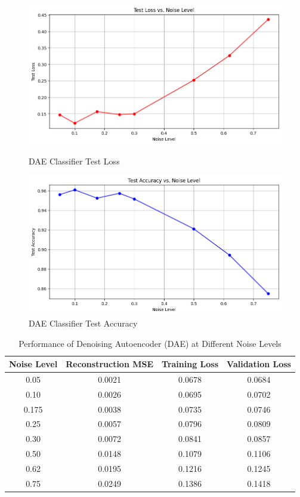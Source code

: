 \begin{figure}[htbp]
  \centering
  \begin{minipage}{0.49\textwidth}
    \includegraphics[width=\linewidth]{figures/dae_testloss.png}
    \caption{DAE Classifier Test Loss}
    \label{fig:dae_testloss}
  \end{minipage}\hfill
  \begin{minipage}{0.49\textwidth}
    \includegraphics[width=\linewidth]{figures/dae_testaccuracy.png}
    \caption{DAE Classifier Test Accuracy}
    \label{fig:dae_testaccuracy}
  \end{minipage}
\end{figure}

\vspace*{1.2in}

\begin{table}[ht]
\centering
\label{tab:dae_performance}
\begin{tabular}{c|c|c|c}
\toprule
\textbf{Noise Level} & \textbf{Reconstruction MSE} & \textbf{Training Loss} & \textbf{Validation Loss} \\
\midrule
0.05 & 0.0021 & 0.0678 & 0.0684 \\
0.10 & 0.0026 & 0.0695 & 0.0702 \\
0.175 & 0.0038 & 0.0735 & 0.0746 \\
0.25 & 0.0057 & 0.0796 & 0.0809 \\
0.30 & 0.0072 & 0.0841 & 0.0857 \\
0.50 & 0.0148 & 0.1079 & 0.1106 \\
0.62 & 0.0195 & 0.1216 & 0.1245 \\
0.75 & 0.0249 & 0.1386 & 0.1418 \\
\bottomrule
\end{tabular}
\caption{Performance of Denoising Autoencoder (DAE) at Different Noise Levels}
\end{table}

